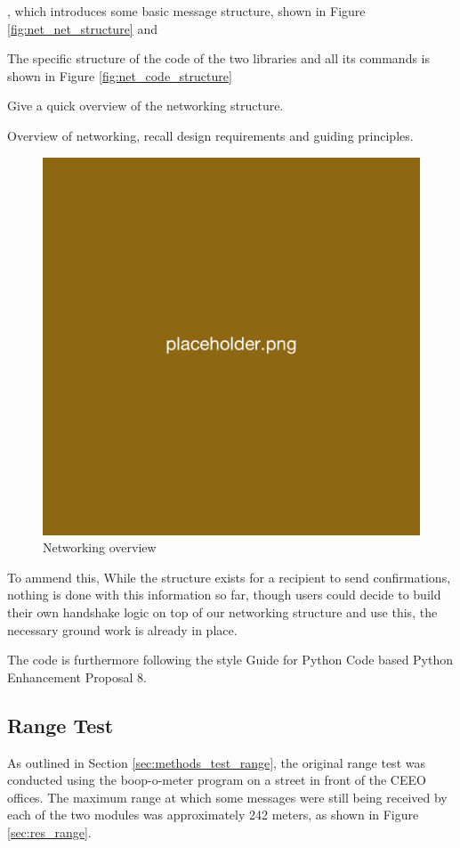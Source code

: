 , which introduces some basic message structure, shown in Figure \ref{fig:net_net_structure} and 

The specific structure of the code of the two libraries and all its commands is shown in Figure \ref{fig:net_code_structure}




Give a quick overview of the networking structure. 

Overview of networking, recall design requirements and guiding principles.

\begin{figure}[H]
    \centering
    \includegraphics[width=0.5\linewidth]{overleaf/images/placeholder.png}
    \vspace{\ftspace}
    \caption{Networking overview}
    \label{fig:Networking overview}
\end{figure}

To ammend this, 
While the structure exists for a recipient to send confirmations, nothing is done with this information so far, though users could decide to build their own handshake logic on top of our networking structure and use this, the necessary ground work is already in place.

The code is furthermore following the style Guide for Python Code based Python Enhancement Proposal 8. \citep{rossum_python_2001}

\subsection{\label{sec:res_range}Range Test}

As outlined in Section \ref{sec:methods_test_range}, the original range test was conducted using the boop-o-meter program on a street in front of the CEEO offices. The maximum range at which some messages were still being received by each of the two modules was approximately 242 meters, as shown in Figure \ref{sec:res_range}.

